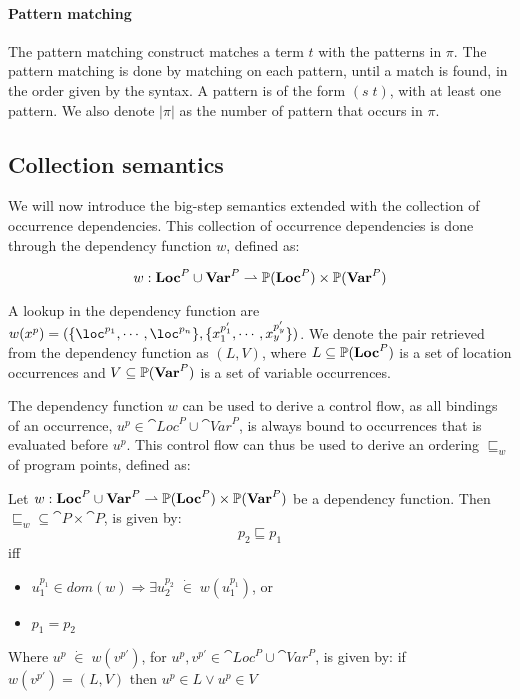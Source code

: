 \documentclass[../../master.tex]{subfiles}
\begin{document}
\paragraph{Pattern matching}
The pattern matching construct matches a term $t$ with the patterns in $\pi$.
The pattern matching is done by matching on each pattern, until a match is found, in the order given by the syntax.
A pattern is of the form $(s\;t)$, with at least one pattern.
We also denote $|\pi|$ as the number of pattern that occurs in $\pi$.

\subsection{Collection semantics}\label{sec:sem}
We will now introduce the big-step semantics extended with the collection of occurrence dependencies.
This collection of occurrence dependencies is done through the dependency function $w$, defined as:

$$w:\textbf{Loc}^P\cup\textbf{Var}^P\rightharpoonup\mathbb{P}(\textbf{Loc}^P)\times\mathbb{P}(\textbf{Var}^P)$$

A lookup in the dependency function are $w(x^p)=(\{\loc^{p_1},\cdots,\loc^{p_n}\},\{x_1^{p'_1},\cdots,x_y^{p'_y}\})$.
We denote the pair retrieved from the dependency function as $(L,V)$, where $L\subseteq\mathbb{P}(\textbf{Loc}^P)$ is a set of location occurrences and $V\subseteq\mathbb{P}(\textbf{Var}^P)$ is a set of variable occurrences.

The dependency function $w$ can be used to derive a control flow, as all bindings of an occurrence, $u^p\in\cat{Loc}^P\cup\cat{Var}^P$, is always bound to occurrences that is evaluated before $u^p$.
This control flow can thus be used to derive an ordering $\sqsubseteq_w$ of program points, defined as:


\begin{definition}[$\sqsubseteq_w$]
	Let $w:\textbf{Loc}^P\cup\textbf{Var}^P\rightharpoonup\mathbb{P}(\textbf{Loc}^P)\times\mathbb{P}(\textbf{Var}^P)$ be a dependency function.
	Then $\sqsubseteq_w\subseteq\cat{P}\times\cat{P}$, is given by:
	$$p_2\sqsubseteq p_1$$
	iff
	\begin{itemize}
		\item $u_1^{p_1}\in dom(w)\Rightarrow\exists u_2^{p_2}\;\dot{\in}\; w(u_1^{p_1})$, or
		\item $p_1=p_2$
	\end{itemize}
	Where $u^{p}\;\dot{\in}\;w(v^{p'})$, for $u^p,v^{p'}\in\cat{Loc}^P\cup\cat{Var}^P$, is given by:
	if $w(v^{p'})=(L,V)$ then $u^{p}\in L\vee u^{p}\in V$
\end{definition}
\end{document}
